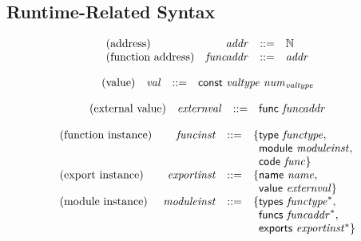 \documentclass{article}
\begin{document}
\subsection{Runtime-Related Syntax}
$$
\begin{array}{@{}lrrl@{}l@{}}
	\mbox{(address)} & {\mathit{addr}} &::=& \mathbb{N} \\
	\mbox{(function address)} & {\mathit{funcaddr}} &::=& {\mathit{addr}} \\
\end{array}
$$

\vspace{1ex}

\vspace{1ex}

$$
\begin{array}{@{}lrrl@{}l@{}}
	\mbox{(value)} & {\mathit{val}} &::=& \mathsf{const}~{\mathit{valtype}}~{{\mathit{num}}}_{{\mathit{valtype}}} \\
\end{array}
$$

\vspace{1ex}

$$
\begin{array}{@{}lrrl@{}l@{}}
	\mbox{(external value)} & {\mathit{externval}} &::=& \mathsf{func}~{\mathit{funcaddr}} \\
\end{array}
$$

\vspace{1ex}

\vspace{1ex}

$$
\begin{array}{@{}lrrl@{}l@{}}
	\mbox{(function instance)} & {\mathit{funcinst}} &::=& \{ \begin{array}[t]{@{}l@{}l@{}}
		\mathsf{type}~{\mathit{functype}},\; \\
		\mathsf{module}~{\mathit{moduleinst}},\; \\
		\mathsf{code}~{\mathit{func}} \}\end{array} \\
	\mbox{(export instance)} & {\mathit{exportinst}} &::=& \{ \begin{array}[t]{@{}l@{}l@{}}
		\mathsf{name}~{\mathit{name}},\; \\
		\mathsf{value}~{\mathit{externval}} \}\end{array} \\
	\mbox{(module instance)} & {\mathit{moduleinst}} &::=& \{ \begin{array}[t]{@{}l@{}l@{}}
		\mathsf{types}~{{\mathit{functype}}^\ast},\; \\
		\mathsf{funcs}~{{\mathit{funcaddr}}^\ast},\; \\
		\mathsf{exports}~{{\mathit{exportinst}}^\ast} \}\end{array} \\
\end{array}
$$
\end{document}
